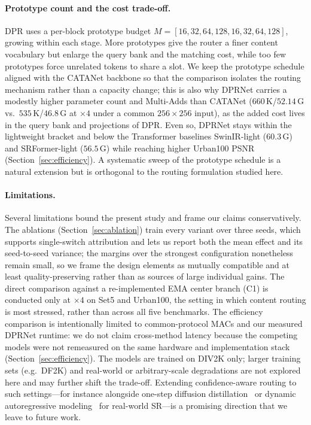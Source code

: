 \paragraph{Prototype count and the cost trade-off.}
DPR uses a per-block prototype budget $M=[16,32,64,128,16,32,64,128]$, growing within
each stage. More prototypes give the router a finer content vocabulary but enlarge the
query bank and the matching cost, while too few prototypes force unrelated tokens to
share a slot. We keep the prototype schedule aligned with the CATANet backbone so that
the comparison isolates the routing mechanism rather than a capacity change; this is also
why DPRNet carries a modestly higher parameter count and Multi-Adds than CATANet
($660$\,K/$52.14$\,G vs.\ $535$\,K/$46.8$\,G at $\times4$ under a common $256{\times}256$ input),
as the added cost lives in the query bank and projections of DPR. Even so, DPRNet stays
within the lightweight bracket and below the Transformer baselines SwinIR-light
($60.3$\,G) and SRFormer-light ($56.5$\,G) while reaching higher Urban100 PSNR
(Section~\ref{sec:efficiency}).
A systematic sweep of the prototype schedule is a natural extension but is orthogonal
to the routing formulation studied here.

\paragraph{Limitations.}
Several limitations bound the present study and frame our claims conservatively. The
ablations (Section~\ref{sec:ablation}) train every variant over three seeds, which
supports single-switch attribution and lets us report both the mean effect and its
seed-to-seed variance; the margins over the strongest configuration nonetheless remain small,
so we frame the design elements as mutually compatible and at least quality-preserving
rather than as sources of large individual gains. The direct comparison against a re-implemented EMA
center branch (C1) is conducted only at $\times4$ on Set5 and Urban100, the setting in which
content routing is most stressed, rather than across all five benchmarks. The efficiency
comparison is intentionally limited to common-protocol MACs and our measured DPRNet runtime:
we do not claim cross-method latency because the competing models were not remeasured on the
same hardware and implementation stack (Section~\ref{sec:efficiency}). The models are trained
on DIV2K only; larger training sets (e.g.\ DF2K) and real-world or arbitrary-scale
degradations are not explored here and may further shift the trade-off. Extending
confidence-aware routing to such settings---for instance alongside one-step diffusion
distillation~\cite{he2026tadsr} or dynamic autoregressive modeling~\cite{zheng2026dvar}
for real-world SR---is a promising direction that we leave to future work.
